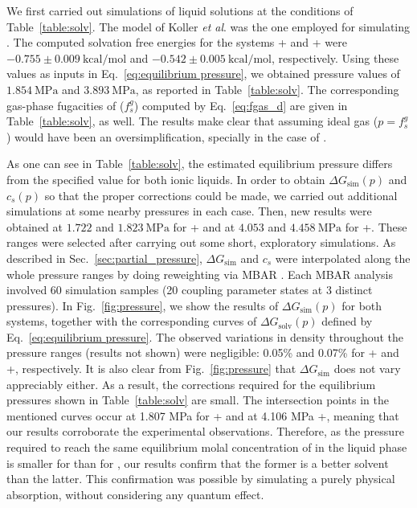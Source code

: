 \documentclass[3p,twocolumn]{elsarticle}
\begin{document}
We first carried out simulations of liquid solutions at the conditions of Table~\ref{table:solv}. The model of Koller \textit{et al}. \cite{Koller_2012} was the one employed for simulating \ce{[emim][B(CN)_4]}. The computed solvation free energies for the systems +\ce{[emim][B(CN)_4]} and +\ce{[emim][NTf_2]} were $-0.755 \pm 0.009 ~\mathrm{kcal/mol}$ and $-0.542 \pm 0.005~\mathrm{kcal/mol}$, respectively. Using these values as inputs in Eq.~\eqref{eq:equilibrium pressure}, we obtained pressure values of $1.854~\mathrm{MPa}$ and $3.893~\mathrm{MPa}$, as reported in Table~\ref{table:solv}.
The corresponding gas-phase fugacities of  ($f_s^g$) computed by Eq.~\eqref{eq:fgas_d} are given in Table~\ref{table:solv}, as well.
The results make clear that assuming ideal gas ($p = f_s^g$) would have been an oversimplification, specially in the case of \ce{[emim][NTf_2]}.

As one can see in Table~\ref{table:solv}, the estimated equilibrium pressure differs from the specified value for both ionic liquids.
In order to obtain $\Delta G_\text{sim}(p)$ and $c_s(p)$ so that the proper corrections could be made, we carried out additional simulations at some nearby pressures in each case.
Then, new results were obtained at $1.722$ and $1.823~\mathrm{MPa}$ for +\ce{[emim][B(CN)_4]} and at $4.053$ and $4.458~\mathrm{MPa}$ for +\ce{[emim][NTf_2]}.
These ranges were selected after carrying out some short, exploratory simulations.
As described in Sec.~\ref{sec:partial_pressure}, $\Delta G_\text{sim}$ and $c_s$ were interpolated along the whole pressure ranges by doing reweighting via MBAR \cite{Shirts_2008}.
Each MBAR analysis involved 60 simulation samples (20 coupling parameter states at 3 distinct pressures).
In Fig.~\ref{fig:pressure}, we show the results of $\Delta G_\text{sim}(p)$ for both systems, together with the corresponding curves of $\Delta G_\text{solv}(p)$ defined by Eq.~\eqref{eq:equilibrium pressure}.
The observed variations in density throughout the pressure ranges (results not shown) were negligible: 0.05\% and 0.07\% for +\ce{[emim][B(CN)_4]} and +\ce{[emim][NTf_2]}, respectively.
It is also clear from Fig.~\ref{fig:pressure} that $\Delta G_\text{sim}$ does not vary appreciably either.
As a result, the corrections required for the equilibrium pressures shown in Table~\ref{table:solv} are small.
The intersection points in the mentioned curves occur at 1.807 MPa for +\ce{[emim][B(CN)_4]} and at 4.106 MPa +\ce{[emim][NTf_2]}, meaning that our results corroborate the experimental observations.
Therefore, as the pressure required to reach the same equilibrium molal concentration of  in the liquid phase is smaller for \ce{[emim][B(CN)_4]} than for \ce{[emim][NTf_2]}, our results confirm that the former is a better solvent than the latter.
This confirmation was possible by simulating a purely physical absorption, without considering any quantum effect.
\end{document}
